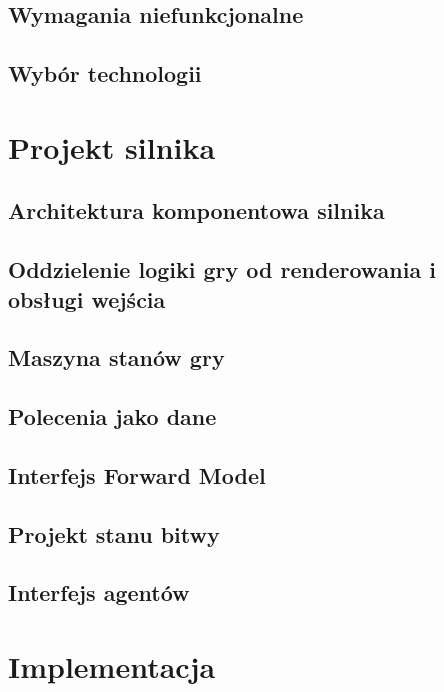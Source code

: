 \documentclass[
    bindingoffset=5mm,
    footnoteindent=3mm,
    hyphenation=true
]{src/wut-thesis}
\begin{document}
\subsection{Wymagania niefunkcjonalne}

\subsection{Wybór technologii}

\clearpage
\section{Projekt silnika}

\subsection{Architektura komponentowa silnika}

\subsection{Oddzielenie logiki gry od renderowania i obsługi wejścia}

\subsection{Maszyna stanów gry}

\subsection{Polecenia jako dane}

\subsection{Interfejs Forward Model}

\subsection{Projekt stanu bitwy}

\subsection{Interfejs agentów}

\clearpage
\section{Implementacja}
\end{document}
